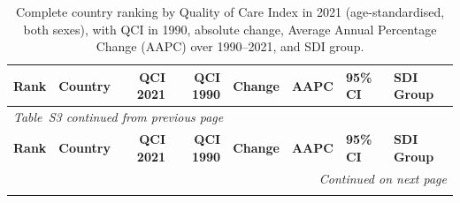 \begin{longtable}{r l r r r r l l}
\caption{Complete country ranking by Quality of Care Index in 2021 (age-standardised, both sexes), with QCI in 1990, absolute change, Average Annual Percentage Change (AAPC) over 1990--2021, and SDI group.}
\label{tab:all_countries} \\
\toprule
\textbf{Rank} & \textbf{Country} & \textbf{QCI 2021} & \textbf{QCI 1990} & \textbf{Change} & \textbf{AAPC} & \textbf{95\% CI} & \textbf{SDI Group} \\
\midrule
\endfirsthead

\multicolumn{8}{l}{\textit{Table~S3 continued from previous page}} \\
\toprule
\textbf{Rank} & \textbf{Country} & \textbf{QCI 2021} & \textbf{QCI 1990} & \textbf{Change} & \textbf{AAPC} & \textbf{95\% CI} & \textbf{SDI Group} \\
\midrule
\endhead

\midrule
\multicolumn{8}{r}{\textit{Continued on next page}} \\
\endfoot


\end{longtable}
